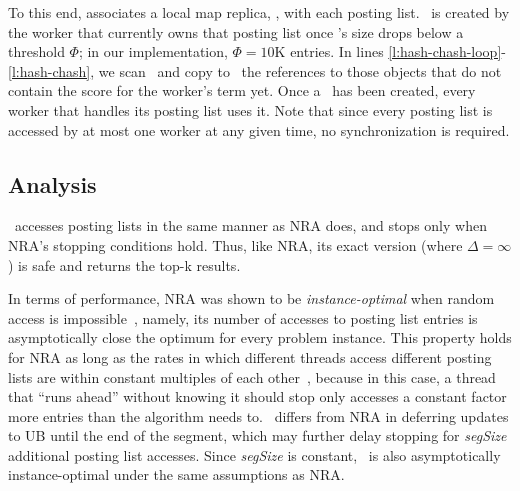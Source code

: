 To this end, \alg\/ associates a local map replica, \TMap, with each posting list. \TMap\ is created by the worker that currently owns that posting list once \DMap's size drops below a threshold $\Phi$;
in our implementation, $\Phi=10$K entries. 
In lines \ref{l:hash-chash-loop}-\ref{l:hash-chash}, we scan \DMap\ and copy to \TMap\ the references to those \Docobj{} objects that do not contain the score for the worker's term yet.  Once a \TMap\ has been created, every worker that handles its posting list uses it.
Note that since every posting list is accessed by at most one worker at any given time, no synchronization is required.
%

\subsection{Analysis}
\label{ssec:analysis}

\alg\ accesses posting lists in the same manner as NRA does, and stops only when NRA's stopping conditions hold. Thus, like NRA, its exact version (where $\Delta = \infty$) is safe and returns the top-k results. 

In terms of performance, NRA was shown to be \emph{instance-optimal} when random access is impossible~\cite{Fagin:2003}, 
namely, its number of accesses to posting list entries is asymptotically close the optimum for every problem instance.  
This property holds for NRA as long as the rates in which different threads access different posting lists are within constant multiples of each other~\cite{Fagin:2003}, because in this case, a thread that ``runs ahead'' without knowing it should stop only accesses a constant factor more entries than the algorithm needs to. 
\alg\  differs from NRA in deferring updates to UB until the end of the segment, 
which may further delay stopping for \emph{segSize} additional posting list accesses. Since \emph{segSize} is constant, \alg\ is also asymptotically
instance-optimal under the same assumptions as NRA.


